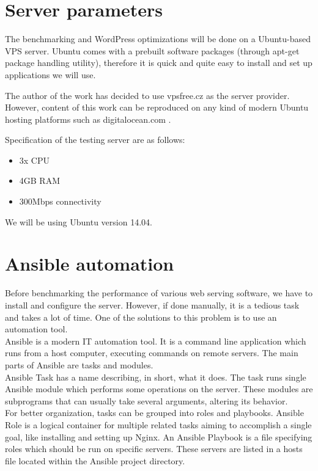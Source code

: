 \section{Server parameters}

The benchmarking and WordPress optimizations will be done on a Ubuntu-based VPS server. Ubuntu comes with a prebuilt software packages (through apt-get package handling utility), therefore it is quick and quite easy to install and set up applications we will use.

The author of the work has decided to use vpsfree.cz \cite{Hosting:vpsfree.cz} as the server provider. However, content of this work can be reproduced on any kind of modern Ubuntu hosting platforms such as digitalocean.com \cite{Hosting:do.com}.

Specification of the testing server are as follows:
\begin{itemize}
	\item 3x CPU
	\item 4GB RAM
	\item 300Mbps connectivity
\end{itemize}

We will be using Ubuntu version 14.04.

\section{Ansible automation}

Before benchmarking the performance of various web serving software, we have to install and configure the server. However, if done manually, it is a tedious task and takes a lot of time. One of the solutions to this problem is to use an automation tool. \\

Ansible is a modern IT automation tool. It is a command line application which runs from a host computer, executing commands on remote servers. The main parts of Ansible are tasks and modules. \\

Ansible Task has a name describing, in short, what it does. The task runs single Ansible module which performs some operations on the server. These modules are subprograms that can usually take several arguments, altering its behavior. \\

For better organization, tasks can be grouped into roles and playbooks. Ansible Role is a logical container for multiple related tasks aiming to accomplish a single goal, like installing and setting up Nginx.  An Ansible Playbook is a file specifying roles which should be run on specific servers. These servers are listed in a hosts file located within the Ansible project directory. \\

